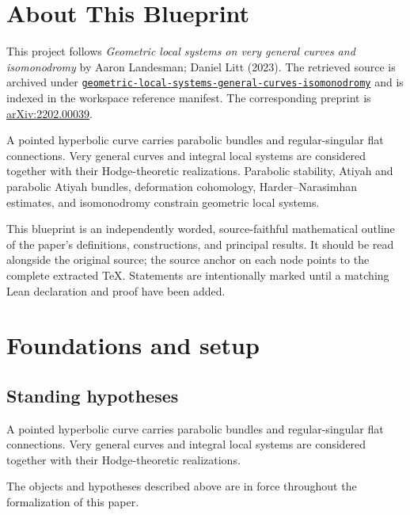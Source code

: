 

\chapter*{About This Blueprint}
\label{geometric-local-systems-general-curves-isomonodromy-about}

This project follows \emph{Geometric local systems on very general curves and isomonodromy} by Aaron Landesman; Daniel Litt (2023). The
retrieved source is archived under
\href{../../../../../references/geometric-local-systems-general-curves-isomonodromy/}{\texttt{geometric-local-systems-general-curves-isomonodromy}} and is indexed in
the workspace reference manifest. The corresponding preprint is
\href{https://arxiv.org/abs/2202.00039}{arXiv:2202.00039}.

A pointed hyperbolic curve carries parabolic bundles and regular-singular flat connections. Very general curves and integral local systems are considered together with their Hodge-theoretic realizations. Parabolic stability, Atiyah and parabolic Atiyah bundles, deformation cohomology, Harder--Narasimhan estimates, and isomonodromy constrain geometric local systems.

This blueprint is an independently worded, source-faithful mathematical
outline of the paper's definitions, constructions, and principal results. It
should be read alongside the original source; the source anchor on each node
points to the complete extracted TeX. Statements are intentionally marked
\notready until a matching Lean declaration and proof have been added.

\chapter{Foundations and setup}
\label{chap:geometric-local-systems-general-curves-isomonodromy-foundations}

\section{Standing hypotheses}
\label{sec:geometric-local-systems-general-curves-isomonodromy-standing}

A pointed hyperbolic curve carries parabolic bundles and regular-singular flat connections. Very general curves and integral local systems are considered together with their Hodge-theoretic realizations.

\begin{convention}
\label{geometric-local-systems-general-curves-isomonodromy-setup}
The objects and hypotheses described above are in force throughout the
formalization of this paper.
\notready
\end{convention}

